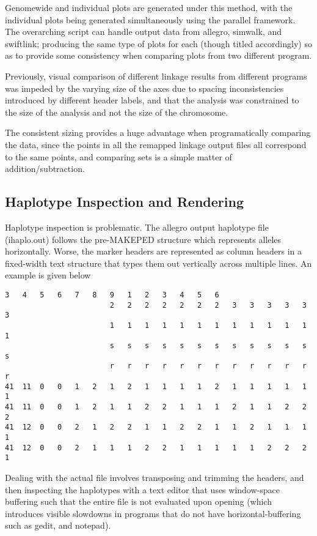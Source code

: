 Genomewide and individual plots are generated under this method, with the individual plots being generated simultaneously using the parallel framework. The overarching script can handle output data from allegro, simwalk, and swiftlink; producing the same type of plots for each (though titled accordingly) so as to provide some consistency when comparing plots from two different program.

Previously, visual comparison of different linkage results from different programs was impeded by the varying size of the axes due to spacing inconsistencies introduced by different header labels, and that the analysis was constrained to the size of the analysis and not the size of the chromosome.

The consistent sizing provides a huge advantage when programatically comparing the data, since the points in all the remapped linkage output files all correspond to the same points, and comparing sets is a simple matter of addition/subtraction.


\subsection{Haplotype Inspection and Rendering}

Haplotype inspection is problematic. The allegro output haplotype file (ihaplo.out) follows the pre-MAKEPED structure which represents alleles horizontally. Worse, the marker headers are represented as column headers in a fixed-width text structure that types them out vertically across multiple lines. An example is given below

\begingroup
\begin{spacing}{1}
\begin{lstlisting}[label=verb:inhaplo]
						3	4	5	6	7	8	9 	1	2	3	4	5	6
						2	2	2	2	2	2	2	3	3	3	3	3	3
						1	1	1	1	1	1	1	1	1	1	1	1	1
						s	s	s	s	s	s	s	s	s	s	s	s	s
      					r	r	r	r	r	r	r	r	r	r	r	r	r
41	11	0	0	1	2	1	2	1	1	1	1	2	1	1	1	1	1	1
41	11	0	0	1	2	1	1	2	2	1	1	1	2	1	1	2	2	2
41	12	0	0	2	1	2	2	1	1	2	2	1	1	2	1	1	1	1
41	12	0	0	2	1	1	1	2	2	1	1	1	1	1	2	2	2	1
\end{lstlisting}
\vspace{-9pt}
\end{spacing}
\endgroup

Dealing with the actual file involves transposing and trimming the headers, and then inspecting the haplotypes with a text editor that uses window-space buffering such that the entire file is not evaluated upon opening (which introduces visible slowdowns in programs that do not have \gls{horizontal-buffering} such as \gls{gedit}, and \gls{notepad}).

